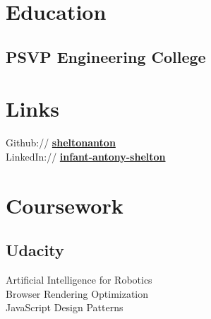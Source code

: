 \documentclass[]{deedy-resume-openfont}
\begin{document}
%
%
\lastupdated

%
%

%
%

\begin{minipage}[t]{0.33\textwidth} 


\section{Education} 

\subsection{PSVP Engineering College}
\sectionsep



\section{Links} 
Github:// \href{https://github.com/sheltonanton}{\bf sheltonanton} \\
LinkedIn://  \href{https://www.linkedin.com/in/infant-antony-shelton/}{\bf infant-antony-shelton} \\


\section{Coursework}
\subsection{Udacity}
Artificial Intelligence for Robotics \\
Browser Rendering Optimization \\
JavaScript Design Patterns \\
\sectionsep


\end{minipage}
\end{document}
